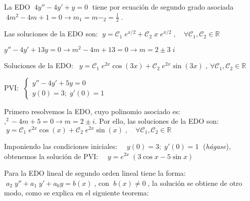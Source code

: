 \begin{cuadro-gris}
\begin{ejem}
La EDO $\; 4y''-4y'+y=0\; $ tiene por ecuación de segundo grado asociada $\; 4m^2-4m+1=0 \to m_1=m-_2=\frac 1 2 \; $.

Las soluciones de la EDO son: $\; y=\mathcal{C}_1\; e^{x/2} + \mathcal{C}_2\;x\; e^{x/2} \; , \quad \forall \mathcal{C}_1,\mathcal{C}_2 \in \mathbb R$
\end{ejem}
\end{cuadro-gris}

\begin{cuadro-gris}
\begin{ejem}
$y''-4y'+13y=0 \to m^2-4m+13=0 \to 	m=2\pm 3\; i$

\noindent Soluciones de la EDO: $\ \; y= \mathcal{C}_1\; e^{2x} \cos (3x) + \mathcal{C}_2\; e^{2x} \sin  (3x) \; , \ \forall \mathcal{C}_1,\mathcal{C}_2 \in \mathbb R$
\end{ejem}
\end{cuadro-gris}

\begin{cuadro-gris}
\begin{ejem}
PVI: $\; \begin{cases} y''-4y'+5y=0 \\ y(0)=3; \; y'(0)=1 \end{cases}$

Primero resolvemos la EDO, cuyo polinomio asociado es: $,^2-4m+5=0 \to m=2\pm  i$. Por ello, las soluciones de la EDO son:
$\; y= \mathcal{C}_1\; e^{2x} \cos (x) + \mathcal{C}_2\; e^{2x} \sin  (x) \; , \quad \forall \mathcal{C}_1,\mathcal{C}_2 \in \mathbb R$

Imponiendo las condiciones iniciales: $\quad y(0)=3; \; y'(0)=1 \; $ (\emph{hágase}), obtenemos la solución de PVI: $\quad y=e^{2x}\; (3\cos x-5\sin x)$
	
\end{ejem}
\end{cuadro-gris}

\vspace{3mm}

Para la EDO lineal de segundo orden lineal tiene la forma: $\; a_2\; y'' + a_1	\; y' + a_0 y= b(x)\; $, con $\; b(x) \neq  0\; $, la solución se obtiene de otro modo, como se explica en el siguiente teorema:

